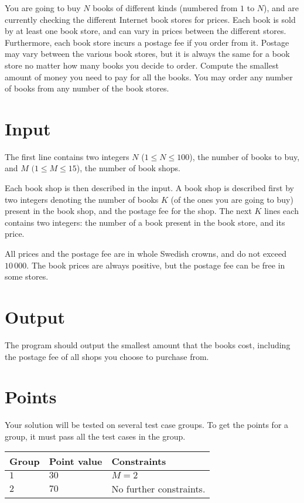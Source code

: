 You are going to buy $N$ books of different kinds (numbered from $1$ to $N$), and are currently checking the different Internet book stores for prices.
Each book is sold by at least one book store, and can vary in prices between the different stores.
Furthermore, each book store incurs a postage fee if you order from it.
Postage may vary between the various book stores, but it is always the same for a book store no matter how many books you decide to order.
Compute the smallest amount of money you need to pay for all the books.
You may order any number of books from any number of the book stores.

\section*{Input}
The first line contains two integers $N$ ($1 \le N \le 100$), the number of books to buy, and $M$ $(1 \le M \le 15$), the number of book shops.

Each book shop is then described in the input.
A book shop is described first by two integers denoting the number of books $K$ (of the ones you are going to buy) present in the book shop, and the postage fee for the shop.
The next $K$ lines each contains two integers: the number of a book present in the book store, and its price.

All prices and the postage fee are in whole Swedish crowns, and do not exceed $10\,000$.
The book prices are always positive, but the postage fee can be free in some stores.

\section*{Output}
The program should output the smallest amount that the books cost, including the postage fee of all shops you choose to purchase from.

\section*{Points}
Your solution will be tested on several test case groups.
To get the points for a group, it must pass all the test cases in the group.

\noindent
\begin{tabular}{| l | l | p{12cm} |}
  \hline
  \textbf{Group} & \textbf{Point value} & \textbf{Constraints} \\ \hline
  $1$    & $30$        & $M=2$ \\ \hline
  $2$    & $70$        & No further constraints. \\ \hline
\end{tabular}
